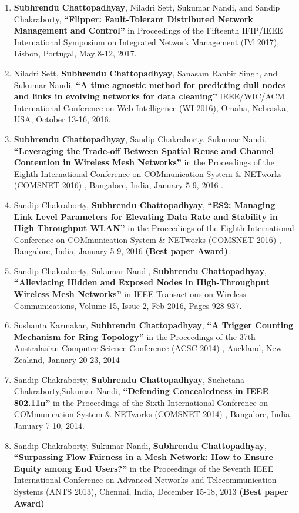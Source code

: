 \documentclass{res}
\newcommand{\papertitle}[1]{\textbf{ ``#1''}}
\begin{document}
\begin{resume}
\begin{enumerate}
		\item {\bf Subhrendu Chattopadhyay}, Niladri Sett, Sukumar Nandi, and Sandip Chakraborty,\papertitle{Flipper: Fault-Tolerant Distributed Network Management and Control} in Proceedings of the Fifteenth IFIP/IEEE International Symposium on Integrated Network Management (IM 2017), Lisbon, Portugal, May 8-12, 2017. 
		\item 	Niladri Sett, {\bf Subhrendu Chattopadhyay}, Sanasam Ranbir Singh, and Sukumar Nandi, \papertitle{A time agnostic method for predicting dull nodes and links in evolving networks for data cleaning} IEEE/WIC/ACM International Conference on Web Intelligence (WI 2016), Omaha, Nebraska, USA, October 13-16, 2016. 
		\item {\bf Subhrendu Chattopadhyay}, Sandip Chakraborty, Sukumar Nandi, \papertitle{Leveraging the Trade-off Between Spatial Reuse and Channel Contention in Wireless Mesh Networks} in the Proceedings of the Eighth International Conference on COMmunication System \& NETworks {(COMSNET 2016)} , Bangalore, India, January 5-9, 2016 .
		\item Sandip Chakraborty, {\bf Subhrendu Chattopadhyay}, \papertitle{ES2: Managing Link Level Parameters for Elevating Data Rate and Stability in High Throughput WLAN} in the Proceedings of the Eighth International Conference on COMmunication System \& NETworks {(COMSNET 2016)} , Bangalore, India, January 5-9, 2016 {\bf (Best paper Award)}.
		\item Sandip Chakraborty, Sukumar Nandi, {\bf Subhrendu Chattopadhyay}, \papertitle{Alleviating Hidden and Exposed Nodes in High-Throughput Wireless Mesh Networks} in IEEE Transactions on Wireless Communications, Volume 15, Issue 2, Feb 2016, Pages 928-937.
		\item Sushanta Karmakar, {\bf Subhrendu Chattopadhyay},  \papertitle{A Trigger Counting Mechanism for Ring Topology}  in the Proceedings of the 37th Australasian Computer Science Conference (ACSC 2014) , Auckland, New Zealand, January 20-23, 2014
		\item Sandip Chakraborty, {\bf Subhrendu Chattopadhyay}, Suchetana Chakraborty,Sukumar Nandi,  \papertitle{Defending Concealedness in IEEE 802.11n}  in the Proceedings of the Sixth International Conference on COMmunication System \& NETworks (COMSNET 2014) , Bangalore, India, January 7-10, 2014.
		\item Sandip Chakraborty, Sukumar Nandi, {\bf Subhrendu Chattopadhyay}, \papertitle{Surpassing Flow Fairness in a Mesh Network: How to Ensure Equity among End Users?}  in the Proceedings of the Seventh IEEE International Conference on Advanced Networks and Telecommunication Systems (ANTS 2013), Chennai, India, December 15-18, 2013 {\bf (Best paper Award)} 
	\end{enumerate}        
\end{resume}
\end{document}
